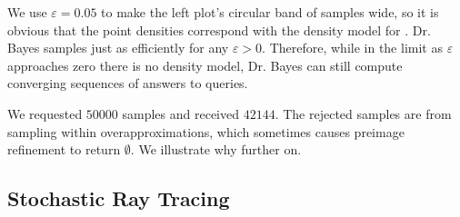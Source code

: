 We use $\varepsilon = 0.05$ to make the left plot's circular band of samples wide, so it is obvious that the point densities correspond with the density model for .
Dr. Bayes samples just as efficiently for any $\varepsilon > 0$.
Therefore, while in the limit as $\varepsilon$ approaches zero there is no density model, Dr. Bayes can still compute converging sequences of answers to queries.

We requested $50000$ samples and received $42144$.
The rejected samples are from sampling within overapproximations, which sometimes causes preimage refinement to return $\emptyset$.
We illustrate why further on.


\subsection{Stochastic Ray Tracing}

